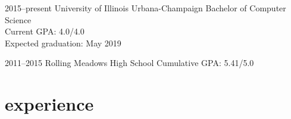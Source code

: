 \documentclass[nofooter]{resume}
\begin{document}
\begin{entrylist}


\entry
{2015--present}
{University of Illinois Urbana-Champaign}
{}
{Bachelor of Computer Science \\
Current GPA: 4.0/4.0 \\
Expected graduation: May 2019}


\entry
{2011--2015}
{Rolling Meadows High School}
{}
{Cumulative GPA: 5.41/5.0}


\end{entrylist}


\section{experience}

\end{document}
